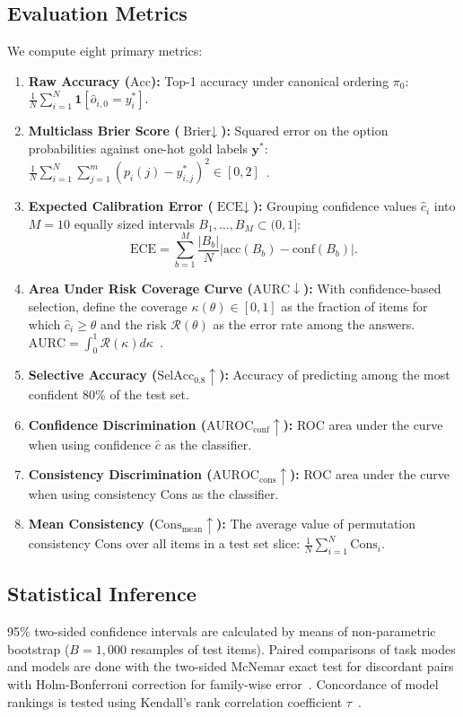 \documentclass[sigconf,nonacm]{acmart}
\makeatletter
\DeclareRobustCommand{\_}{\ifmmode\nfss@text{\textunderscore}\else\textunderscore\allowbreak\fi}
\makeatother
\begin{document}
\subsection{Evaluation Metrics}
We compute eight primary metrics:
\begin{enumerate}
    \item \textbf{Raw Accuracy ($\text{Acc}$):} Top-1 accuracy under canonical ordering $\pi_0$: $\frac{1}{N} \sum_{i=1}^N \mathbf{1}[\hat{o}_{i, 0} = y_i^*]$.
    \item \textbf{Multiclass Brier Score ($\text{Brier} \downarrow$):} Squared error on the option probabilities against one-hot gold labels $\mathbf{y}^*$: $\frac{1}{N} \sum_{i=1}^N \sum_{j=1}^m (p_i(j) - y_{i,j}^*)^2 \in [0, 2]$~\cite{brier1950verification}.
    \item \textbf{Expected Calibration Error ($\text{ECE} \downarrow$):} Grouping confidence values $\hat{c}_i$ into $M=10$ equally sized intervals $B_1, \dots, B_M \subset (0, 1]$:
    \begin{equation}
        \text{ECE} = \sum_{b=1}^M \frac{|B_b|}{N} |\text{acc}(B_b) - \text{conf}(B_b)|.
    \end{equation}
    \item \textbf{Area Under Risk Coverage Curve ($\mathrm{AURC} \downarrow$):} With confidence-based selection, define the coverage $\kappa(\theta) \in [0, 1]$ as the fraction of items for which $\hat{c}_i \ge \theta$ and the risk $\mathcal{R}(\theta)$ as the error rate among the answers. $\mathrm{AURC} = \int_0^1 \mathcal{R}(\kappa) d\kappa$~\cite{geifman2017selective}.
    \item \textbf{Selective Accuracy ($\text{SelAcc}_{0.8} \uparrow$):} Accuracy of predicting among the most confident 80\% of the test set.
    \item \textbf{Confidence Discrimination ($\text{AUROC}_{\text{conf}} \uparrow$):} ROC area under the curve when using confidence $\hat{c}$ as the classifier.
    \item \textbf{Consistency Discrimination ($\text{AUROC}_{\text{cons}} \uparrow$):} ROC area under the curve when using consistency $\text{Cons}$ as the classifier.
    \item \textbf{Mean Consistency ($\text{Cons}_{\text{mean}} \uparrow$):} The average value of permutation consistency $\text{Cons}$ over all items in a test set slice: $\frac{1}{N} \sum_{i=1}^N \text{Cons}_i$.
\end{enumerate}

\subsection{Statistical Inference}
95\% two-sided confidence intervals are calculated by means of non-parametric bootstrap ($B=1{,}000$ resamples of test items). Paired comparisons of task modes and models are done with the two-sided McNemar exact test for discordant pairs with Holm-Bonferroni correction for family-wise error~\cite{mcnemar1947,holm1979}. Concordance of model rankings is tested using Kendall's rank correlation coefficient $\tau$~\cite{kendall1938}.
\end{document}
